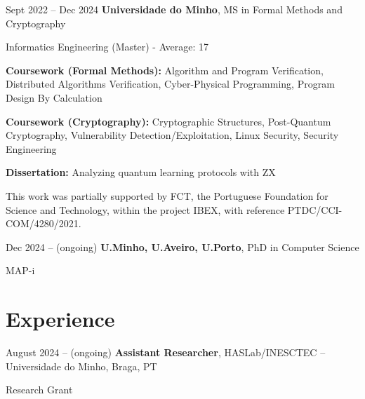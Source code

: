 \documentclass[10pt, letterpaper]{article}
\begin{document}
        \begin{twocolentry}{
            Sept 2022 – Dec 2024
        }
            \textbf{Universidade do Minho}, MS in Formal Methods and Cryptography\end{twocolentry}
        Informatics Engineering (Master) - Average: 17
        \vspace{0.10 cm}
        \begin{onecolentry}
            \begin{highlights}
                \item \textbf{Coursework (Formal Methods):} Algorithm and Program Verification, Distributed Algorithms Verification, Cyber-Physical Programming, Program Design By Calculation
                \item \textbf{Coursework (Cryptography):} Cryptographic Structures, Post-Quantum Cryptography, Vulnerability Detection/Exploitation, Linux Security, Security Engineering
                \item \textbf{Dissertation:} Analyzing quantum learning protocols with ZX

                \scriptsize{This work was partially supported by FCT, the Portuguese Foundation for Science and Technology, within the project IBEX, with reference PTDC/CCI-COM/4280/2021.}
                
                
            \end{highlights}
        \end{onecolentry}


        \vspace{0.2cm}

        \begin{twocolentry}{
            Dec 2024 – (ongoing)
        }
            \textbf{U.Minho, U.Aveiro, U.Porto}, PhD in Computer Science\end{twocolentry}
        MAP-i


    
    \section{Experience}


        \begin{twocolentry}{
            August 2024 – (ongoing)
        }
            \textbf{Assistant Researcher}, HASLab/INESCTEC -- Universidade do Minho, Braga, PT\end{twocolentry}
        Research Grant
\end{document}
